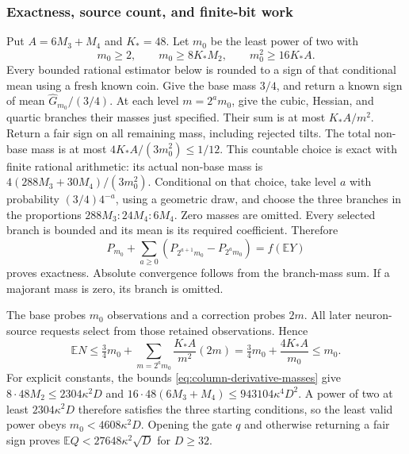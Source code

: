 \subsubsection{Exactness, source count, and finite-bit work}

Put $A=6M_3+M_4$ and $K_*=48$.  Let $m_0$ be the least power of two with
\begin{equation}
 m_0\ge2,\qquad m_0\ge8K_*M_2,
 \qquad m_0^2\ge16K_*A.
 \label{eq:column-starting-degree}
\end{equation}
Every bounded rational estimator below is rounded to a sign of that
conditional mean using a fresh known coin.  Give the base mass $3/4$,
and return a known sign of mean
$\widehat G_{m_0}/(3/4)$.  At each level $m=2^am_0$, give the
cubic, Hessian, and quartic branches their masses just specified.
Their sum is at most $K_*A/m^2$.  Return a fair sign on all remaining
mass, including rejected tilts.  The total non-base mass is at most
$4K_*A/(3m_0^2)\le1/12$.  This countable choice is exact with finite
rational arithmetic: its actual non-base mass is
$4(288M_3+30M_4)/(3m_0^2)$.  Conditional on that choice, take level
$a$ with probability $(3/4)4^{-a}$, using a geometric draw, and
choose the three branches in the proportions
$288M_3:24M_4:6M_4$.  Zero masses are omitted.
Every selected branch is bounded and its
mean is its required coefficient.  Therefore
\[
 P_{m_0}+\sum_{a\ge0}(P_{2^{a+1}m_0}-P_{2^am_0})
       =f(\mathbb E Y)
\]
proves exactness.  Absolute convergence follows from the branch-mass
sum.  If a majorant mass is zero, its branch is omitted.

The base probes $m_0$ observations and a correction probes $2m$.
All later neuron-source requests select from those retained
observations.  Hence
\begin{equation}
 \mathbb E N\le\tfrac34m_0+
       \sum_{m=2^am_0}\frac{K_*A}{m^2}(2m)
       =\tfrac34m_0+\frac{4K_*A}{m_0}\le m_0.
 \label{eq:column-source-count}
\end{equation}
For explicit constants, the bounds
\eqref{eq:column-derivative-masses} give
$8\cdot48M_2\le2304\kappa^2D$ and
$16\cdot48(6M_3+M_4)\le943104\kappa^4D^2$.
A power of two at least $2304\kappa^2D$ therefore satisfies the
three starting conditions, so the least valid power obeys
$m_0<4608\kappa^2D$.  Opening the gate $q$ and otherwise returning
a fair sign proves
$\mathbb E Q<27648\kappa^2\sqrt D$ for $D\ge32$.

